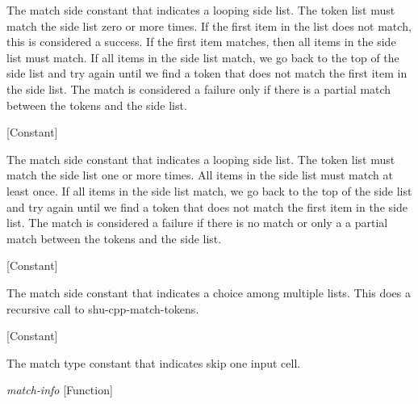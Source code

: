 \begin{doc-string}
The match side constant that indicates a looping side list.  The token list
must match the side list zero or more times.  If the first item in the list does
not match, this is considered a success.  If the first item matches, then all
items in the side list must match.  If all items in the side list match, we go
back to the top of the side list and try again until we find a token that does
not match the first item in the side list.  The match is considered a failure
only if there is a partial match between the tokens and the side list.
\end{doc-string}

\vspace{1em}
\noindent
{}
\usebox{\funcname}
 \hfill [Constant]

\begin{doc-string}
The match side constant that indicates a looping side list.  The token list
must match the side list one or more times.  All items in the side list must
match at least once.  If all items in the side list match, we go back to the top
of the side list and try again until we find a token that does not match the
first item in the side list.  The match is considered a failure if there is no
match or only a a partial match between the tokens and the side list.
\end{doc-string}

\vspace{1em}
\noindent
{}
\usebox{\funcname}
 \hfill [Constant]

\begin{doc-string}
The match side constant that indicates a choice among multiple lists.
This does a recursive call to shu-cpp-match-tokens.
\end{doc-string}

\vspace{1em}
\noindent
{}
\usebox{\funcname}
 \hfill [Constant]

\begin{doc-string}
The match type constant that indicates skip one input cell.
\end{doc-string}

\vspace{1em}
\noindent
{}
\usebox{\funcname}\emph{match-info}
 \hfill [Function]

